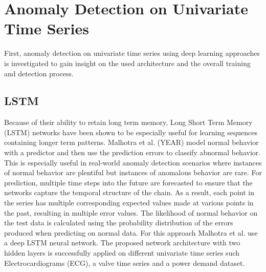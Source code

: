 %
%
%
%

\section{Anomaly Detection on Univariate Time Series}

First, anomaly detection on univariate time series using deep learning approaches is investigated to gain insight on the used architecture and the overall training and detection process. 

\subsection{LSTM}

Because of their ability to retain long term memory, Long Short Term Memory (LSTM) networks have been shown to be especially useful for learning sequences containing longer term patterns. Malhotra et al. (YEAR) model normal behavior with a predictor and then use the prediction errors to classify abnormal behavior. This is especially useful in real-world anomaly detection scenarios where instances of normal behavior are plentiful but instances of anomalous behavior are rare. For prediction, multiple time steps into the future are forecasted to ensure that the networks capture the temporal structure of the chain. As a result, each point in the series has multiple corresponding expected values made at various points in the past, resulting in multiple error values. The likelihood of normal behavior on the test data is calculated using the probability distribution of the errors produced when predicting on normal data. For this approach Malhotra et al. use a deep LSTM neural network. The proposed network architecture with two hidden layers is successfully applied on different univariate time series such Electrocardiograms (ECG), a valve time series and a power demand dataset. 


